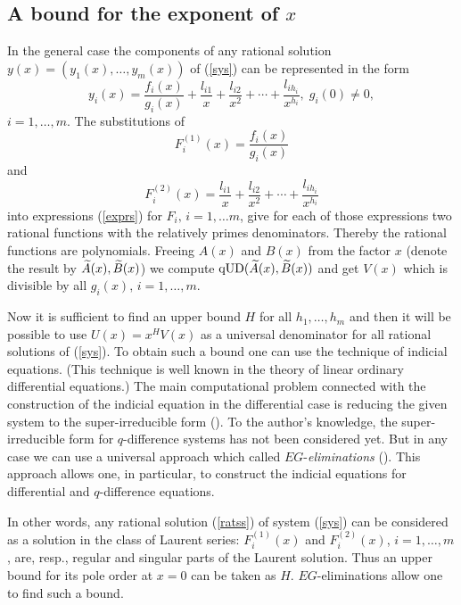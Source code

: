 \subsection{A bound for the exponent of $x$}
\label{x}

In the general case the components of
any rational solution $y(x)=(y_1(x),\dots ,y_m(x))$ of
(\ref{sys}) can be represented in the form
\begin{equation}
\label{ratss}
y_i(x)=\frac{f_i(x)}{g_i(x)}
+\frac{l_{i1}}{x}
+\frac{l_{i2}}{x^2}
+\cdots
+\frac{l_{ih_{i}}}{x^{h_i}},\;g_i(0)\neq 0,
\end{equation}
$i=1,\dots ,m$. The substitutions of
$$F_i^{(1)}(x)=\frac{f_i(x)}{g_i(x)}$$
and
$$F_i^{(2)}(x)=
\frac{l_{i1}}{x}
+\frac{l_{i2}}{x^2}
+\cdots
+\frac{l_{ih_{i}}}{x^{h_i}}$$
into expressions (\ref{exprs}) for $F_i,\,i=1,\dots m$,
give for each of those expressions two rational functions with
the relatively primes denominators. Thereby the rational functions
are polynomials. Freeing  $A(x)$ and $B(x)$
from the factor $x$ (denote the result by ${\widetilde A}(x),{\widetilde B}(x)$)
we compute
${\rm qUD}({\widetilde A}(x),{\widetilde B}(x))$
and get $V(x)$ which is
divisible by all $g_i(x),\,i=1,\dots ,m$.

Now it is sufficient
to find an upper bound $H$ for all $h_1,\dots ,h_m$ and then it will
be possible to use $U(x)=x^HV(x)$ as a universal denominator for all
rational solutions of (\ref{sys}).
To obtain such a bound one can use the technique of indicial
equations. (This technique is well known in the theory of linear
ordinary differential equations.) The main computational problem
connected with the construction of the indicial equation
in the differential case is
reducing the given system to  the super-irreducible form
(\cite{HW87,Bar89}). To the author's knowledge,
the super-irreducible form
for  $q$-difference systems
has not been considered yet. But in any case we can use a universal
approach which called $EG$-{\em eliminations} (\cite{EG}). This
approach allows one, in particular, to construct the indicial
equations for differential and $q$-difference equations.

In other words, any rational solution
(\ref{ratss}) of system (\ref{sys}) can be considered as a
solution in the class of Laurent series:  $F_i^{(1)}(x)$ and
$F_i^{(2)}(x)$, $i=1,\dots ,m$, are, resp., regular and singular
parts of the Laurent solution. Thus an upper bound for
its pole order
at $x=0$ can be taken as $H$.  $EG$-eliminations allow one to find
such a bound.

